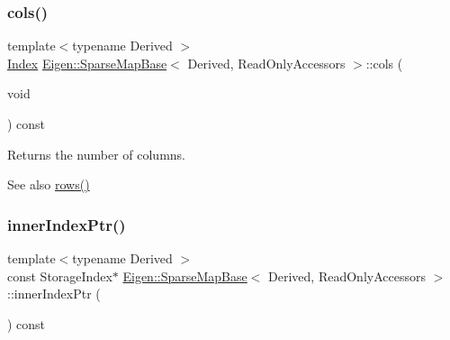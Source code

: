 \subsubsection{\texorpdfstring{cols()}{cols()}}
{\footnotesize\ttfamily template$<$typename Derived $>$ \\
\mbox{\hyperlink{struct_eigen_1_1_eigen_base_a554f30542cc2316add4b1ea0a492ff02}{Index}} \mbox{\hyperlink{class_eigen_1_1_sparse_map_base}{Eigen\+::\+Sparse\+Map\+Base}}$<$ Derived, Read\+Only\+Accessors $>$\+::cols (\begin{DoxyParamCaption}\item[{void}]{ }\end{DoxyParamCaption}) const\hspace{0.3cm}{\ttfamily [inline]}}





\begin{DoxyReturn}{Returns}
the number of columns. 
\end{DoxyReturn}
\begin{DoxySeeAlso}{See also}
\mbox{\hyperlink{class_eigen_1_1_sparse_map_base_3_01_derived_00_01_read_only_accessors_01_4_a3cdd6cab0abd7ac01925a695fc315d34}{rows()}} 
\end{DoxySeeAlso}
\mbox{\label{class_eigen_1_1_sparse_map_base_3_01_derived_00_01_read_only_accessors_01_4_ab044564756f472877b2c1a5706e540e2}} 
\subsubsection{\texorpdfstring{innerIndexPtr()}{innerIndexPtr()}}
{\footnotesize\ttfamily template$<$typename Derived $>$ \\
const Storage\+Index$\ast$ \mbox{\hyperlink{class_eigen_1_1_sparse_map_base}{Eigen\+::\+Sparse\+Map\+Base}}$<$ Derived, Read\+Only\+Accessors $>$\+::inner\+Index\+Ptr (\begin{DoxyParamCaption}{ }\end{DoxyParamCaption}) const\hspace{0.3cm}{\ttfamily [inline]}}





